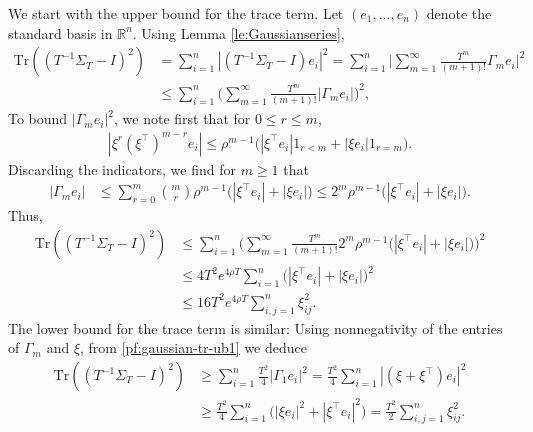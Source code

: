 \documentclass[11pt,reqno]{amsart}
\numberwithin{equation}{section}
\theoremstyle{definition}
\def\BB{{\Gamma}}
\def\R{{\mathbb R}}
\def\tr{{\mathrm{Tr}}}
\begin{document}
We start with the upper bound for the trace term. Let $(e_1,\ldots,e_n)$ denote the standard basis in $\R^n$. Using Lemma \ref{le:Gaussianseries},
\begin{align}
\tr((T^{-1}\Sigma_T - I)^2) &= \sum_{i=1}^n | (T^{-1}\Sigma_T - I) e_i|^2 = \sum_{i=1}^n \bigg|\sum_{m=1}^{\infty} \frac{T^m}{(m+1)!} \BB_m e_i\bigg|^2 \label{pf:gaussian-tr-ub1} \\
	&\le \sum_{i=1}^n\bigg(\sum_{m=1}^{\infty} \frac{T^m}{(m+1)!}  |\BB_m e_i|\bigg)^2, \nonumber
\end{align}
To bound $|\Gamma_me_i|^2$, we note first that for $0 \le r \le m$,
\begin{align*}
|\xi^r(\xi^\top)^{m-r}e_i| \le \rho^{m-1}\big(|\xi^\top e_i|1_{r < m} + |\xi e_i|1_{r  =  m}\big).
\end{align*} 
Discarding the indicators, we find for $m \ge 1$ that
\begin{align*}
|\BB_m e_i| &\le \sum_{r=0}^m {m \choose r}\rho^{ m-1 }\big(|\xi^\top e_i|  + |\xi e_i| \big) \le 2^m\rho^{m-1}\big(|\xi^\top e_i|  + |\xi e_i| \big).
\end{align*}
Thus,
\begin{align}
\tr((T^{-1}\Sigma_T - I)^2)  &\le \sum_{i=1}^n\bigg(\sum_{m=1}^{\infty} \frac{T^m}{(m+1)!}  2^m\rho^{m-1}\big(|\xi^\top e_i|  + |\xi e_i| \big)\bigg)^2 \nonumber \\
	&\le 4T^2 e^{4\rho T}\sum_{i=1}^n \big(|\xi^\top e_i|   + |\xi e_i| \big)^2 \nonumber \\
	&\le  16 T^2 e^{4\rho T}\sum_{i,j=1}^n \xi_{ij}^2 . \label{pf:gaussian-ubfinal1}
\end{align}
The lower bound for the trace term is similar: Using nonnegativity of the entries of $\BB_m$ and $\xi$, from  \eqref{pf:gaussian-tr-ub1} we deduce
\begin{align}
\tr((T^{-1}\Sigma_T - I)^2)  &\ge \sum_{i=1}^n \frac{T^2}{4}|\Gamma_1e_i|^2 = \frac{T^2}{4}\sum_{i=1}^n |(\xi+\xi^\top)e_i|^2 \nonumber \\
	&\ge \frac{T^2}{4}\sum_{i=1}^n \big(| \xi e_i|^2 + |\xi^\top e_i|^2\big) = \frac{T^2}{2}\sum_{i,j=1}^n \xi_{ij}^2 .  \label{pf:gaussian-lbfinal1}
\end{align}
\end{document}

